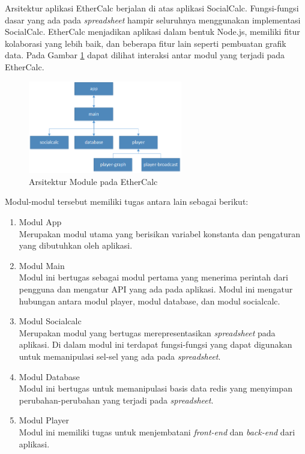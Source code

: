 Arsitektur aplikasi EtherCalc berjalan di atas aplikasi SocialCalc. Fungsi-fungsi dasar yang ada pada \textit{spreadsheet} hampir seluruhnya menggunakan implementasi SocialCalc. EtherCalc menjadikan aplikasi dalam bentuk Node.js, memiliki fitur kolaborasi yang lebih baik, dan beberapa fitur lain seperti pembuatan grafik data. Pada Gambar \ref{ModulEtherCalc} dapat dilihat interaksi antar modul yang terjadi pada EtherCalc.

\begin{figure}[htb]
    \centering
    \includegraphics[width=0.6\textwidth]{resources/chapter-2-module-ethercalc.png}
    \caption{Arsitektur Module pada EtherCalc}
    \label{ModulEtherCalc}
\end{figure}

Modul-modul tersebut memiliki tugas antara lain sebagai berikut:
\begin{enumerate}
    \item Modul App \\
          Merupakan modul utama yang berisikan variabel konstanta dan pengaturan yang dibutuhkan oleh aplikasi.
    \item Modul Main \\
          Modul ini bertugas sebagai modul pertama yang menerima perintah dari pengguna dan mengatur API yang ada pada aplikasi. Modul ini mengatur hubungan antara modul player, modul database, dan modul socialcalc.
    \item Modul Socialcalc \\
          Merupakan modul yang bertugas merepresentasikan \textit{spreadsheet} pada aplikasi. Di dalam modul ini terdapat fungsi-fungsi yang dapat digunakan untuk memanipulasi sel-sel yang ada pada \textit{spreadsheet}.
    \item Modul Database \\
          Modul ini bertugas untuk memanipulasi basis data redis yang menyimpan perubahan-perubahan yang terjadi pada \textit{spreadsheet}.
    \item Modul Player \\
          Modul ini memiliki tugas untuk menjembatani \textit{front-end} dan \textit{back-end} dari aplikasi.
\end{enumerate}

